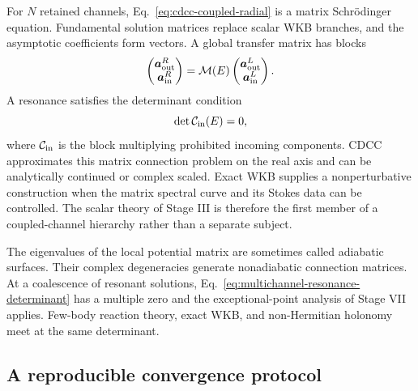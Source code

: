 For $N$ retained channels, Eq.~\eqref{eq:cdcc-coupled-radial} is a matrix
Schr\"odinger equation.  Fundamental solution matrices replace scalar WKB
branches, and the asymptotic coefficients form vectors.  A global transfer
matrix has blocks
\begin{equation}
  \begin{pmatrix}
  \bm a_{\mathrm{out}}^{R}\\
  \bm a_{\mathrm{in}}^{R}
  \end{pmatrix}
  =\mathcal M(E)
  \begin{pmatrix}
  \bm a_{\mathrm{out}}^{L}\\
  \bm a_{\mathrm{in}}^{L}
  \end{pmatrix}.
  \label{eq:multichannel-transfer}
\end{equation}
A resonance satisfies the determinant condition
\begin{equation}
  \det\mathcal{C}_{\mathrm{in}}(E)=0,
  \label{eq:multichannel-resonance-determinant}
\end{equation}
where $\mathcal{C}_{\mathrm{in}}$ is the block multiplying prohibited incoming
components.  CDCC approximates this matrix connection problem on the real
axis and can be analytically continued or complex scaled.  Exact WKB supplies
a nonperturbative construction when the matrix spectral curve and its Stokes
data can be controlled.  The scalar theory of Stage III is therefore the
first member of a coupled-channel hierarchy rather than a separate subject.

The eigenvalues of the local potential matrix are sometimes called adiabatic
surfaces.  Their complex degeneracies generate nonadiabatic connection
matrices.  At a coalescence of resonant solutions,
Eq.~\eqref{eq:multichannel-resonance-determinant} has a multiple zero and the
exceptional-point analysis of Stage VII applies.  Few-body reaction theory,
exact WKB, and non-Hermitian holonomy meet at the same determinant.

\subsection{A reproducible convergence protocol}
\label{subsec:cdcc-convergence-protocol}


